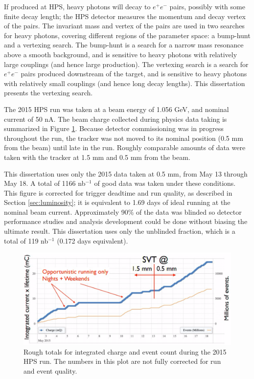 If produced at HPS, heavy photons will decay to $e^+e^-$ pairs, possibly with some finite decay length; the HPS detector measures the momentum and decay vertex of the pairs.
The invariant mass and vertex of the pairs are used in two searches for heavy photons, covering different regions of the parameter space: a bump-hunt and a vertexing search.
The bump-hunt is a search for a narrow mass resonance above a smooth background, and is sensitive to heavy photons with relatively large couplings (and hence large production).
The vertexing search is a search for $e^+e^-$ pairs produced downstream of the target, and is sensitive to heavy photons with relatively small couplings (and hence long decay lengths).
This dissertation presents the vertexing search.

The 2015 HPS run was taken at a beam energy of 1.056 GeV, and nominal current of 50 nA.
The beam charge collected during physics data taking is summarized in Figure \ref{fig:beamtime}.
Because detector commissioning was in progress throughout the run, the tracker was not moved to its nominal position (0.5 mm from the beam) until late in the run.
Roughly comparable amounts of data were taken with the tracker at 1.5 mm and 0.5 mm from the beam.

This dissertation uses only the 2015 data taken at 0.5 mm, from May 13 through May 18.
A total of 1166 nb$^{-1}$ of good data was taken under these conditions.
This figure is corrected for trigger deadtime and run quality, as described in Section \ref{sec:luminosity}; it is equivalent to 1.69 days of ideal running at the nominal beam current.
Approximately 90\% of the data was blinded so detector performance studies and analysis development could be done without biasing the ultimate result.
This dissertation uses only the unblinded fraction, which is a total of 119 nb$^{-1}$ (0.172 days equivalent).

\begin{figure}[ht]
    \includegraphics[width=\textwidth]{intro/figs/engrun-beamtime}
    \caption{Rough totals for integrated charge and event count during the 2015 HPS run. The numbers in this plot are not fully corrected for run and event quality.}
    \label{fig:beamtime}
\end{figure}

